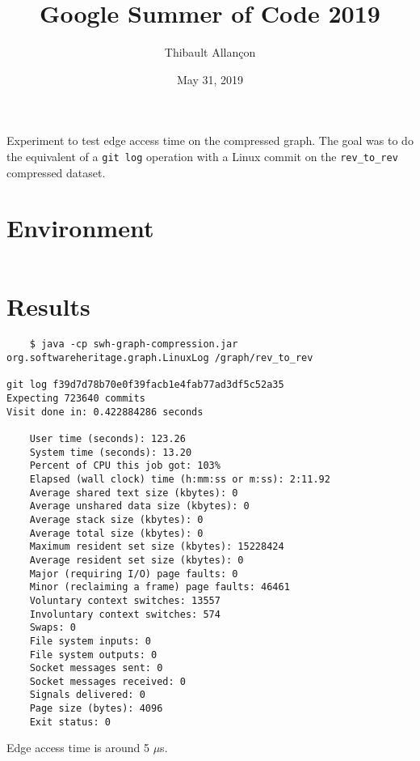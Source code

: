 \documentclass[11pt,a4paper]{article}
\title{Google Summer of Code 2019}
\author{Thibault Allançon}
\date{May 31, 2019}
\begin{document}
\maketitle

Experiment to test edge access time on the compressed graph. The goal was to do
the equivalent of a \texttt{git log} operation with a Linux commit on
the \texttt{rev_to_rev} compressed dataset.

\section{Environment}

\begin{footnotesize}
\inputminted{java}{LinuxLog.java}
\end{footnotesize}

\section{Results}

\begin{small}
\begin{verbatim}
    $ java -cp swh-graph-compression.jar org.softwareheritage.graph.LinuxLog /graph/rev_to_rev

git log f39d7d78b70e0f39facb1e4fab77ad3df5c52a35
Expecting 723640 commits
Visit done in: 0.422884286 seconds

    User time (seconds): 123.26
    System time (seconds): 13.20
    Percent of CPU this job got: 103%
    Elapsed (wall clock) time (h:mm:ss or m:ss): 2:11.92
    Average shared text size (kbytes): 0
    Average unshared data size (kbytes): 0
    Average stack size (kbytes): 0
    Average total size (kbytes): 0
    Maximum resident set size (kbytes): 15228424
    Average resident set size (kbytes): 0
    Major (requiring I/O) page faults: 0
    Minor (reclaiming a frame) page faults: 46461
    Voluntary context switches: 13557
    Involuntary context switches: 574
    Swaps: 0
    File system inputs: 0
    File system outputs: 0
    Socket messages sent: 0
    Socket messages received: 0
    Signals delivered: 0
    Page size (bytes): 4096
    Exit status: 0
\end{verbatim}
\end{small}

Edge access time is around 5 $\mu$s.
\end{document}
